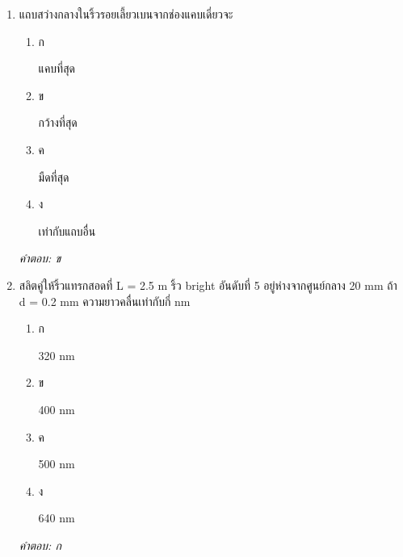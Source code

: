 \documentclass[12pt]{article}
\begin{document}
\begin{enumerate}[label=\arabic*., itemsep=0.5\baselineskip, topsep=0.5\baselineskip, leftmargin=*]
\item แถบสว่างกลางในริ้วรอยเลี้ยวเบนจากช่องแคบเดี่ยวจะ
\begin{enumerate}[label=\alph*)., itemsep=0.3\baselineskip, topsep=0.3\baselineskip]
\item ก\ 
\begin{minipage}[t]{0.9\linewidth}
\raggedright แคบที่สุด
\end{minipage}
\item ข\ 
\begin{minipage}[t]{0.9\linewidth}
\raggedright กว้างที่สุด
\end{minipage}
\item ค\ 
\begin{minipage}[t]{0.9\linewidth}
\raggedright มืดที่สุด
\end{minipage}
\item ง\ 
\begin{minipage}[t]{0.9\linewidth}
\raggedright เท่ากับแถบอื่น
\end{minipage}
\end{enumerate}
\vspace{-0.3\baselineskip}
\begin{small}
\textit{คำตอบ: ข}
\end{small}

\item สลิตคู่ให้ริ้วแทรกสอดที่ L = 2.5 m ริ้ว bright อันดับที่ 5 อยู่ห่างจากศูนย์กลาง 20 mm ถ้า d = 0.2 mm ความยาวคลื่นเท่ากับกี่ nm
\begin{enumerate}[label=\alph*)., itemsep=0.3\baselineskip, topsep=0.3\baselineskip]
\item ก\ 
\begin{minipage}[t]{0.9\linewidth}
\raggedright 320 nm
\end{minipage}
\item ข\ 
\begin{minipage}[t]{0.9\linewidth}
\raggedright 400 nm
\end{minipage}
\item ค\ 
\begin{minipage}[t]{0.9\linewidth}
\raggedright 500 nm
\end{minipage}
\item ง\ 
\begin{minipage}[t]{0.9\linewidth}
\raggedright 640 nm
\end{minipage}
\end{enumerate}
\vspace{-0.3\baselineskip}
\begin{small}
\textit{คำตอบ: ก}
\end{small}


\end{enumerate}
\end{document}
